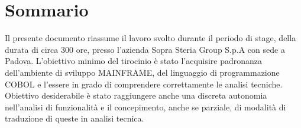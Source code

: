 
\cleardoublepage
{}
{}
\begingroup
\let\clearpage\relax
\let\cleardoublepage\relax
\let\cleardoublepage\relax

\chapter*{Sommario}

Il presente documento riassume il lavoro svolto durante il periodo di stage, della durata di circa 300 ore, presso l’azienda Sopra Steria Group S.p.A con sede a Padova.
L’obiettivo minimo del tirocinio è stato l'acquisire padronanza dell'ambiente di sviluppo MAINFRAME, del linguaggio di programmazione COBOL e l'essere in grado di comprendere correttamente le analisi tecniche.
Obiettivo desiderabile è stato raggiungere anche una discreta autonomia nell'analisi di funzionalità e il concepimento, anche se parziale, di modalità di traduzione di queste in analisi tecnica.

%
%

\endgroup			

\vfill

